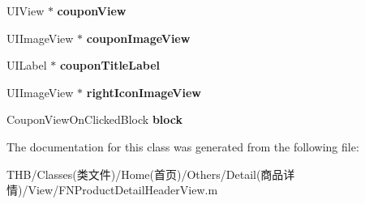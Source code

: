 \begin{DoxyCompactItemize}
U\+I\+View $\ast$ {\bfseries coupon\+View}
\item 
\mbox{\label{interface_f_n_product_detail_header_subview_a5a492b6d1d9ea6e27f3909ca1d52af37}} 
U\+I\+Image\+View $\ast$ {\bfseries coupon\+Image\+View}
\item 
\mbox{\label{interface_f_n_product_detail_header_subview_a2daff7b0bbe059f8f2a61a57e7f73c88}} 
U\+I\+Label $\ast$ {\bfseries coupon\+Title\+Label}
\item 
\mbox{\label{interface_f_n_product_detail_header_subview_a93ec7aee1b54ee4fa8b0501bb6e30038}} 
U\+I\+Image\+View $\ast$ {\bfseries right\+Icon\+Image\+View}
\item 
\mbox{\label{interface_f_n_product_detail_header_subview_aa5e6c738da74539209f8df3ae5878975}} 
Coupon\+View\+On\+Clicked\+Block {\bfseries block}
\end{DoxyCompactItemize}


The documentation for this class was generated from the following file\+:\begin{DoxyCompactItemize}
\item 
T\+H\+B/\+Classes(类文件)/\+Home(首页)/\+Others/\+Detail(商品详情)/\+View/F\+N\+Product\+Detail\+Header\+View.\+m\end{DoxyCompactItemize}
